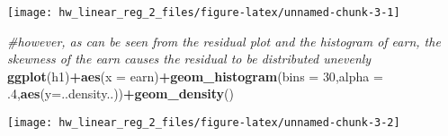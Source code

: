 \documentclass[]{article}
\newenvironment{Shaded}{\begin{snugshade}}{\end{snugshade}}
\newcommand{\CommentTok}[1]{\textcolor[rgb]{0.56,0.35,0.01}{\textit{#1}}}
\newcommand{\DataTypeTok}[1]{\textcolor[rgb]{0.13,0.29,0.53}{#1}}
\newcommand{\DecValTok}[1]{\textcolor[rgb]{0.00,0.00,0.81}{#1}}
\newcommand{\FloatTok}[1]{\textcolor[rgb]{0.00,0.00,0.81}{#1}}
\newcommand{\KeywordTok}[1]{\textcolor[rgb]{0.13,0.29,0.53}{\textbf{#1}}}
\newcommand{\NormalTok}[1]{#1}
\newcommand{\OperatorTok}[1]{\textcolor[rgb]{0.81,0.36,0.00}{\textbf{#1}}}
\newcommand{\StringTok}[1]{\textcolor[rgb]{0.31,0.60,0.02}{#1}}
\begin{document}
\begin{Shaded}
\end{Shaded}

\begin{center}\texttt{[image: hw\_linear\_reg\_2\_files/figure-latex/unnamed-chunk-3-1]} \end{center}

\begin{Shaded}
\begin{Highlighting}[]
\CommentTok{#however, as can be seen from the residual plot and the histogram of earn, the skewness of the earn causes the residual to be distributed unevenly}
\KeywordTok{ggplot}\NormalTok{(h1)}\OperatorTok{+}\KeywordTok{aes}\NormalTok{(}\DataTypeTok{x =}\NormalTok{ earn)}\OperatorTok{+}\KeywordTok{geom_histogram}\NormalTok{(}\DataTypeTok{bins =} \DecValTok{30}\NormalTok{,}\DataTypeTok{alpha =} \FloatTok{.4}\NormalTok{,}\KeywordTok{aes}\NormalTok{(}\DataTypeTok{y=}\NormalTok{..density..))}\OperatorTok{+}\KeywordTok{geom_density}\NormalTok{()}
\end{Highlighting}
\end{Shaded}

\begin{center}\texttt{[image: hw\_linear\_reg\_2\_files/figure-latex/unnamed-chunk-3-2]} \end{center}
\end{document}
